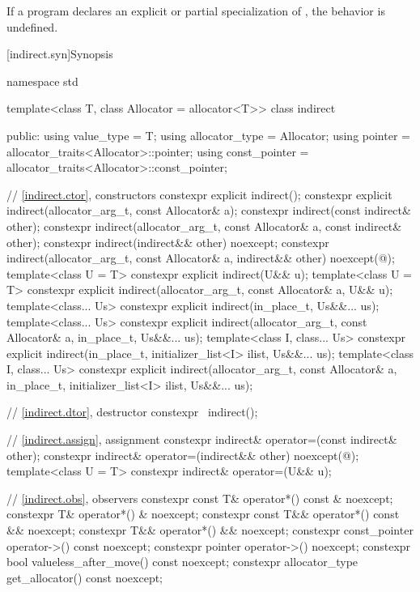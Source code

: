 \pnum
If a program declares an explicit or partial specialization of ,
the behavior is undefined.

[indirect.syn]{Synopsis}

%
\begin{codeblock}
namespace std {
  template<class T, class Allocator = allocator<T>>
  class indirect {
  public:
    using value_type = T;
    using allocator_type = Allocator;
    using pointer = allocator_traits<Allocator>::pointer;
    using const_pointer = allocator_traits<Allocator>::const_pointer;

    // \ref{indirect.ctor}, constructors
    constexpr explicit indirect();
    constexpr explicit indirect(allocator_arg_t, const Allocator& a);
    constexpr indirect(const indirect& other);
    constexpr indirect(allocator_arg_t, const Allocator& a, const indirect& other);
    constexpr indirect(indirect&& other) noexcept;
    constexpr indirect(allocator_arg_t, const Allocator& a, indirect&& other)
      noexcept(@\seebelow@);
    template<class U = T>
      constexpr explicit indirect(U&& u);
    template<class U = T>
      constexpr explicit indirect(allocator_arg_t, const Allocator& a, U&& u);
    template<class... Us>
      constexpr explicit indirect(in_place_t, Us&&... us);
    template<class... Us>
      constexpr explicit indirect(allocator_arg_t, const Allocator& a,
                                  in_place_t, Us&&... us);
    template<class I, class... Us>
      constexpr explicit indirect(in_place_t, initializer_list<I> ilist, Us&&... us);
    template<class I, class... Us>
      constexpr explicit indirect(allocator_arg_t, const Allocator& a,
                                  in_place_t, initializer_list<I> ilist, Us&&... us);

    // \ref{indirect.dtor}, destructor
    constexpr ~indirect();

    // \ref{indirect.assign}, assignment
    constexpr indirect& operator=(const indirect& other);
    constexpr indirect& operator=(indirect&& other) noexcept(@\seebelow@);
    template<class U = T>
      constexpr indirect& operator=(U&& u);

    // \ref{indirect.obs}, observers
    constexpr const T& operator*() const & noexcept;
    constexpr T& operator*() & noexcept;
    constexpr const T&& operator*() const && noexcept;
    constexpr T&& operator*() && noexcept;
    constexpr const_pointer operator->() const noexcept;
    constexpr pointer operator->() noexcept;
    constexpr bool valueless_after_move() const noexcept;
    constexpr allocator_type get_allocator() const noexcept;

}}
\end{codeblock}

